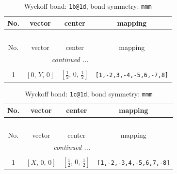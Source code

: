 \documentclass[fleqn,8pt]{jsarticle}
\begin{document}
\renewcommand{\arraystretch}{1.2}
\begin{longtable}{cccc}
\caption{Wyckoff bond: {\tt 1b@1d}, bond symmetry: {\tt mmm}}
 \\
 \hline \hline
No. & vector & center & mapping \\ \hline \endfirsthead

\multicolumn{3}{l}{\tablename\ \thetable{}} \\
 \hline \hline
No. & vector & center & mapping \\ \hline \endhead

 \hline \hline
\multicolumn{3}{r}{\footnotesize\it continued ...} \\ \endfoot

 \hline \hline
\multicolumn{3}{r}{} \\ \endlastfoot

1 & $\left[ 0,\, Y,\, 0 \right]$ & $\left[ \frac{1}{2},\, 0,\, \frac{1}{2} \right]$ & {\tt [1,-2,3,-4,-5,6,-7,8]} \\
\end{longtable}
\renewcommand{\arraystretch}{1.2}
\begin{longtable}{cccc}
\caption{Wyckoff bond: {\tt 1c@1d}, bond symmetry: {\tt mmm}}
 \\
 \hline \hline
No. & vector & center & mapping \\ \hline \endfirsthead

\multicolumn{3}{l}{\tablename\ \thetable{}} \\
 \hline \hline
No. & vector & center & mapping \\ \hline \endhead

 \hline \hline
\multicolumn{3}{r}{\footnotesize\it continued ...} \\ \endfoot

 \hline \hline
\multicolumn{3}{r}{} \\ \endlastfoot

1 & $\left[ X,\, 0,\, 0 \right]$ & $\left[ \frac{1}{2},\, 0,\, \frac{1}{2} \right]$ & {\tt [1,-2,-3,4,-5,6,7,-8]} \\
\end{longtable}
\renewcommand{\arraystretch}{1.2}
\end{document}
